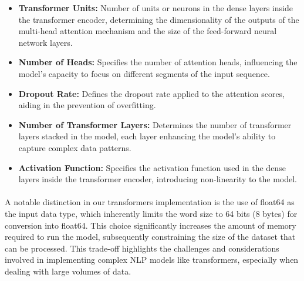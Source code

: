         \begin{itemize}
        \item \textbf{Transformer Units:} Number of units or neurons in the dense layers inside the transformer encoder, determining the dimensionality of the outputs of the multi-head attention mechanism and the size of the feed-forward neural network layers.
        \item \textbf{Number of Heads:} Specifies the number of attention heads, influencing the model's capacity to focus on different segments of the input sequence.
        \item \textbf{Dropout Rate:} Defines the dropout rate applied to the attention scores, aiding in the prevention of overfitting.
        \item \textbf{Number of Transformer Layers:} Determines the number of transformer layers stacked in the model, each layer enhancing the model's ability to capture complex data patterns.
        \item \textbf{Activation Function:} Specifies the activation function used in the dense layers inside the transformer encoder, introducing non-linearity to the model.
        \end{itemize}
        
        \paragraph{}A notable distinction in our transformers implementation is the use of float64 as the input data type, which inherently limits the word size to 64 bits (8 bytes) for conversion into float64. This choice significantly increases the amount of memory required to run the model, subsequently constraining the size of the dataset that can be processed. This trade-off highlights the challenges and considerations involved in implementing complex NLP models like transformers, especially when dealing with large volumes of data.
        
